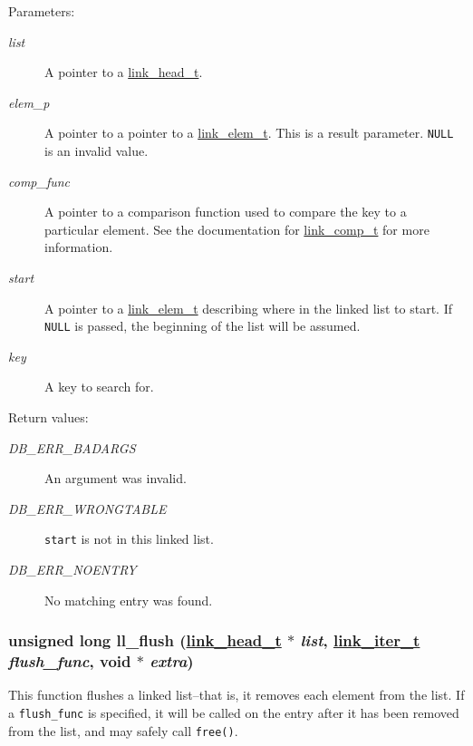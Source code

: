 \begin{Desc}
\item[Parameters:]
\begin{description}
\item[{\em list}]A pointer to a \hyperlink{group__dbprim__link_a0}{link\_\-head\_\-t}. \item[{\em elem\_\-p}]A pointer to a pointer to a \hyperlink{group__dbprim__link_a1}{link\_\-elem\_\-t}. This is a result parameter. {\tt NULL} is an invalid value. \item[{\em comp\_\-func}]A pointer to a comparison function used to compare the key to a particular element. See the documentation for \hyperlink{group__dbprim__link_a3}{link\_\-comp\_\-t} for more information. \item[{\em start}]A pointer to a \hyperlink{group__dbprim__link_a1}{link\_\-elem\_\-t} describing where in the linked list to start. If {\tt NULL} is passed, the beginning of the list will be assumed. \item[{\em key}]A key to search for.\end{description}
\end{Desc}
\begin{Desc}
\item[Return values:]
\begin{description}
\item[{\em DB\_\-ERR\_\-BADARGS}]An argument was invalid. \item[{\em DB\_\-ERR\_\-WRONGTABLE}]{\tt start} is not in this linked list. \item[{\em DB\_\-ERR\_\-NOENTRY}]No matching entry was found. \end{description}
\end{Desc}
\hypertarget{group__dbprim__link_a11}{
\subsubsection[ll\_\-flush]{\setlength{\rightskip}{0pt plus 5cm}unsigned long ll\_\-flush (\hyperlink{dbprim_8h_a0}{link\_\-head\_\-t} $\ast$ {\em list}, \hyperlink{dbprim_8h_a2}{link\_\-iter\_\-t} {\em flush\_\-func}, void $\ast$ {\em extra})}}
\label{group__dbprim__link_a11}


This function flushes a linked list--that is, it removes each element from the list. If a {\tt flush\_\-func} is specified, it will be called on the entry after it has been removed from the list, and may safely call {\tt free()}.

